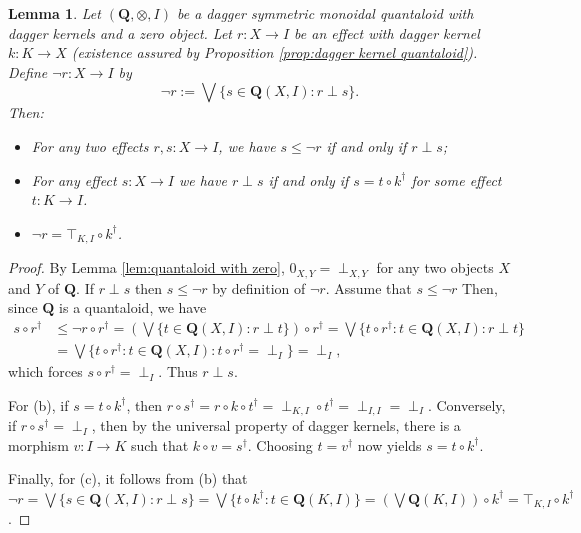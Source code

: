 \documentclass[12pt]{tac}
\newtheorem{lemma}[theorem]{Lemma}
\theoremstyle{definition}
\theoremstyle{remark}
\newcommand{\<}{\langle}
\renewcommand{\>}{\rangle}
\renewcommand{\:}{\colon}
\begin{document}
\begin{lemma}\label{lem:characterizations of negation}
    Let $(\mathbf Q,\otimes,I)$ be a dagger symmetric monoidal quantaloid with dagger kernels and a zero object. Let $r:X\to I$ be an effect with dagger kernel $k:K\to X$ (existence assured by Proposition \ref{prop:dagger kernel quantaloid}). Define
    $\neg r:X\to I$ by 
    \[\neg r:=\bigvee\{s\in\mathbf Q(X,I):r\perp s\}.\]
      Then:
    \begin{itemize}
    \item[(a)]    For any two effects $r,s:X\to I$, we have $s\leq \neg r$ if and only if $r\perp s$;
    \item[(b)] For any effect $s:X\to I$ we have $r\perp s$ if and only if $s=t\circ k^\dag$ for some effect $t:K\to I$.
    \item[(c)] $\neg r=\top_{K,I}\circ k^\dag$.
    \end{itemize}
\end{lemma}
\begin{proof}
By Lemma \ref{lem:quantaloid with zero}, $0_{X,Y}=\perp_{X,Y}$ for any two objects $X$ and $Y$ of $\mathbf Q$. If $r\perp s$ then $s\leq\neg r$ by definition of $\neg r$. Assume that $s\leq \neg r$ Then, since $\mathbf Q$ is a quantaloid, we have 
\begin{align*}
s\circ r^\dag & \leq \neg r\circ r^\dag = \left(\bigvee\{t\in\mathbf Q(X,I):r\perp t\}\right)\circ r^\dag  = \bigvee\{t\circ r^\dag:t\in\mathbf Q(X,I):r\perp t\} \\
& = \bigvee\{t\circ r^\dag:t\in\mathbf Q(X,I):t\circ r^\dag=\perp_I\}=\perp_I,
\end{align*}
which forces $s\circ r^\dag=\perp_I$. Thus $r\perp s$.

    For (b), if $s=t\circ k^\dag$, then $r\circ s^\dag=r\circ k\circ t^\dag=\perp_{K,I}\circ t^\dag=\perp_{I,I}=\perp_I$. Conversely, if $r\circ s^\dag=\perp_I$, then by the universal property of dagger kernels, there is a morphism $v:I\to K$ such that $k\circ v=s^\dag$. Choosing $t=v^\dag$ now yields $s=t\circ k^\dag$.

    Finally, for (c), it follows from (b) that $\neg r=\bigvee\{s\in\mathbf Q(X,I):r\perp s\}=\bigvee\{t\circ k^\dag:t\in\mathbf Q(K, I)\}=\left(\bigvee\mathbf Q(K,I)\right)\circ k^\dag=\top_{K,I}\circ k^\dag$.\end{proof}
\end{document}
